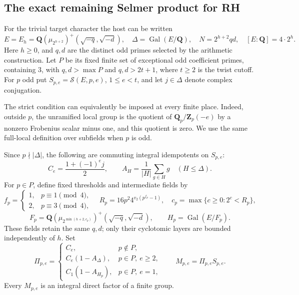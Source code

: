 \subsection{The exact remaining Selmer product for RH}
\label{shared-rh-selmer-product}

For the trivial target character the host can be written
\[
 E=E_h=\mathbf Q(\mu_{2^{h+2}})^+(\sqrt{-q},\sqrt{-d}),
 \quad \Delta=\operatorname{Gal}(E/\mathbf Q),\quad
 N=2^{h+2}qd,\quad [E:\mathbf Q]=4\cdot2^h.
\]
Here \(h\ge0\), and \(q,d\) are the distinct odd primes selected
by the arithmetic construction. Let \(P\) be its fixed finite set of
exceptional odd coefficient primes, containing \(3\), with
\(q,d>\max P\) and \(q,d>2t+1\), where \(t\ge2\) is the twist
cutoff. For \(p\) odd put \(S_{p,e}=\mathcal S(E,p,e)\),
\(1\le e<t\), and let \(j\in\Delta\) denote complex conjugation.

The strict condition can equivalently be imposed at every finite place.
Indeed, outside \(p\), the unramified local group is the quotient of
\(\mathbf Q_p/\mathbf Z_p(-e)\) by a nonzero Frobenius scalar minus
one, and this quotient is zero. We use the same full-local definition
over subfields when \(p\) is odd.

Since \(p\nmid|\Delta|\), the following are commuting integral
idempotents on \(S_{p,e}\):
\[
 C_e=\frac{1+(-1)^e j}{2},\qquad
 A_H=\frac1{|H|}\sum_{g\in H}g\quad(H\le\Delta).
\]
For \(p\in P\), define fixed thresholds and intermediate fields by
\[
 f_p=\begin{cases}1,&p\equiv1\pmod4,\\2,&p\equiv3\pmod4,\end{cases}
 \quad R_p=16p^2 4^{v_2(p^{f_p}-1)},\quad
 c_p=\max\{c\ge0:2^c<R_p\},
\]
\[
 F_p=\mathbf Q(\mu_{2^{\min(h+2,c_p)}})^+
                       (\sqrt{-q},\sqrt{-d}),
 \qquad H_p=\operatorname{Gal}(E/F_p).
\]
These fields retain the same \(q,d\); only their cyclotomic layers are
bounded independently of \(h\). Set
\begin{equation}\label{shared-rh-selmer-projectors}
 \Pi_{p,e}=\begin{cases}
 C_e,&p\notin P,\\
 C_e(1-A_\Delta),&p\in P,\ e\ge2,\\
 C_1(1-A_{H_p}),&p\in P,\ e=1,
 \end{cases}
 \qquad M_{p,e}=\Pi_{p,e}S_{p,e}.
\end{equation}
Every \(M_{p,e}\) is an integral direct factor of a finite group.


